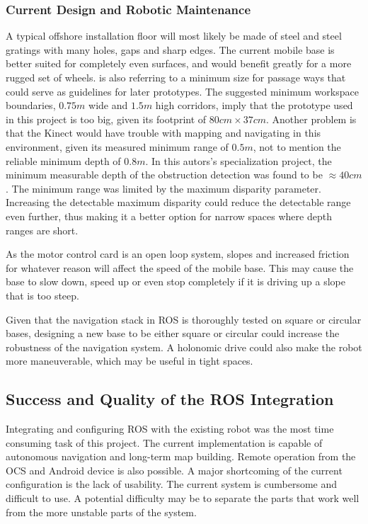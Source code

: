 \subsubsection{Current Design and Robotic Maintenance}
\label{sec:design_maintenance}
A typical offshore installation floor will most likely be made of steel and steel gratings with many holes, gaps and sharp edges\cite{graf2008mobile}. The current mobile base is better suited for completely even surfaces, and would benefit greatly for a more rugged set of wheels. \cite{graf2008mobile} is also referring to a minimum size for passage ways that could serve as guidelines for later prototypes. The suggested minimum workspace boundaries, $0.75m$ wide and $1.5m$ high corridors, imply that the prototype used in this project is too big, given its footprint of $80cm \times 37 cm$. Another problem is that the Kinect would have trouble with mapping and navigating in this environment, given its measured minimum range of $0.5m$, not to mention the reliable minimum depth of $0.8m$. In this autors's specialization project\cite{lindrup}, the minimum measurable depth of the obstruction detection was found to be $\approx 40 cm$. The minimum range was limited by the maximum disparity parameter. Increasing the detectable maximum disparity could reduce the detectable range even further, thus making it a better option for narrow spaces where depth ranges are short. 

As the motor control card is an open loop system, slopes and increased friction for whatever reason will affect the speed of the mobile base. This may cause the base to slow down, speed up or even stop completely if it is driving up a slope that is too steep.

Given that the navigation stack in \ac{ROS} is thoroughly tested on square or circular bases, designing a new base to be either square or circular could increase the robustness of the navigation system. A holonomic drive could also make the robot more maneuverable, which may be useful in tight spaces.



\subsection{Success and Quality of the ROS Integration}

Integrating and configuring \ac{ROS} with the existing robot was the most time consuming task of this project. The current implementation is capable of autonomous navigation and long-term map building. Remote operation from the \ac{OCS} and Android device is also possible. A major shortcoming of the current configuration is the lack of usability. The current system is 
cumbersome and difficult to use. A potential difficulty may be to separate the parts that work well from the more unstable parts of the system. 


